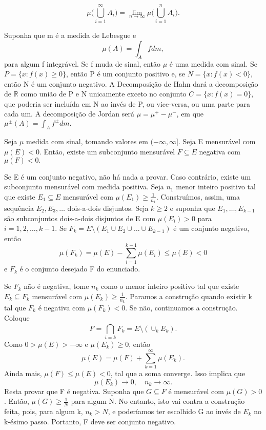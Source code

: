 \documentclass[measure_theory.tex]{subfiles}
\begin{document}
\[
	\mu \biggl(\bigcup_{i=1}^{\infty}A_{i}\biggr) = \lim_{n\to \infty}\mu \biggl(\bigcup_{i=1}^{n}A_{i}\biggr).
\]
\begin{example}
	Suponha que m é a medida de Lebesgue e
	\[
		\mu (A) = \int_{A}f dm,
	\]
	para algum f integrável. Se f muda de sinal, então \(\mu \) é uma medida com sinal.
	Se \(P = \{x: f(x)\geq 0  \}\), então P é um conjunto positivo e, se \(N = \{x:f(x)<0\},\) então N é um conjunto negativo. A Decomposição de Hahn dará a decomposição de \(\mathbb{R}\) como união de P e N unicamente exceto no conjunto \(C = \{x: f(x) = 0\},\) que
	poderia ser incluída em N ao invés de P, ou vice-versa, ou uma parte para cada um. A decomposição de Jordan será \(\mu  = \mu ^{+} - \mu ^{-}\), em que \(\mu ^{\pm}(A) = \int_{A}f^{\pm} dm.\)
\end{example}
\begin{prop*}
	Seja \(\mu \) medida com sinal, tomando valores em \((-\infty, \infty].\) Seja E mensurável com \(\mu(E) < 0\). Então, existe um subconjunto mensurável \(F\subseteq E\) negativa com \(\mu (F) < 0.\)
\end{prop*}
\begin{proof*}
	Se E é um conjunto negativo, não há nada a provar. Caso contrário, existe um subconjunto mensurável com medida positiva. Seja \(n_1\) menor inteiro positivo tal que existe \(E_1\subseteq E\) mensurável com
	\(\mu (E_1)\geq \frac{1}{n_1}\). Construímos, assim, uma sequência \(E_2, E_3, \dotsc \) dois-a-dois disjuntos. Seja \(k\geq 2\) e suponha que \(E_1, \dotsc , E_{k-1}\) são subconjuntos dois-a-dois disjuntos de E com
	\(\mu (E_{i}) > 0\) para \(i=1, 2, \dotsc , k-1\). Se \(F_{k}=E\setminus{(E_1\cup E_2\cup \dotsc \cup E_{k-1})}\) é um conjunto negativo, então
	\[
		\mu (F_{k}) = \mu (E) - \sum\limits_{i=1}^{k-1}\mu (E_{i}) \leq \mu (E) < 0
	\]
	e \(F_{k}\) é o conjunto desejado F do enunciado.

	Se \(F_{k}\) não é negativa, tome \(n_{k}\) como o menor inteiro positivo tal que existe \(E_{k}\subseteq F_{k}\) mensurável com \(\mu (E_{k})\geq \frac{1}{n_{k}}\).
	Paramos a construção quando existir k tal que \(F_{k}\) é negativa com \(\mu (F_{k}) < 0.\) Se não, continuamos a construção. Coloque
	\[
		F= \bigcap_{i=k}^{}F_{k} = E\setminus{(\cup _k E_{k})}.
	\]
	Como \(0 > \mu (E) > -\infty\) e \(\mu (E_{k})\geq 0\), então
	\[
		\mu (E) = \mu (F) + \sum\limits_{k=1}^{\infty}\mu (E_{k}).
	\]
	Ainda mais, \(\mu (F) \leq \mu (E) < 0\), tal que a soma converge. Isso implica que
	\[
		\mu (E_{k})\to 0,\quad n_{k}\to \infty.
	\]
	Resta provar que F é negativa. Suponha que \(G\subseteq F\) é mensurável com \(\mu (G) > 0\). Então, \(\mu (G) \geq \frac{1}{N}\) para algum N. No entanto, isto vai contra a construção feita, pois, para algum k, \(n_{k}> N\), e poderíamos ter escolhido
	G ao invés de \(E_{k}\) no k-ésimo passo. Portanto, F deve ser conjunto negativo. \qedsymbol
\end{proof*}
\end{document}
